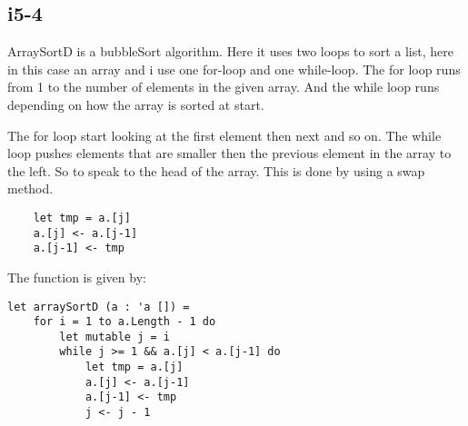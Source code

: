 \subsection{i5-4} 

ArraySortD is a bubbleSort algorithm. Here it uses two loops to sort a list, here in this case an array and i use one for-loop and one while-loop. The for loop runs from 1 to the number of elements in the given array. And the while loop runs depending on how the array is sorted at start.

The for loop start looking at the first element then next and so on. The while loop pushes elements that are smaller then the previous element in the array to the left. So to speak to the head of the array. This is done by using a swap method.

\begin{verbatim}
	let tmp = a.[j]
	a.[j] <- a.[j-1]
	a.[j-1] <- tmp
\end{verbatim}

The function is given by: 

\lstset{}
\begin{lstlisting}
let arraySortD (a : 'a []) =
    for i = 1 to a.Length - 1 do
        let mutable j = i
        while j >= 1 && a.[j] < a.[j-1] do
            let tmp = a.[j]
            a.[j] <- a.[j-1]
            a.[j-1] <- tmp
            j <- j - 1

\end{lstlisting}


